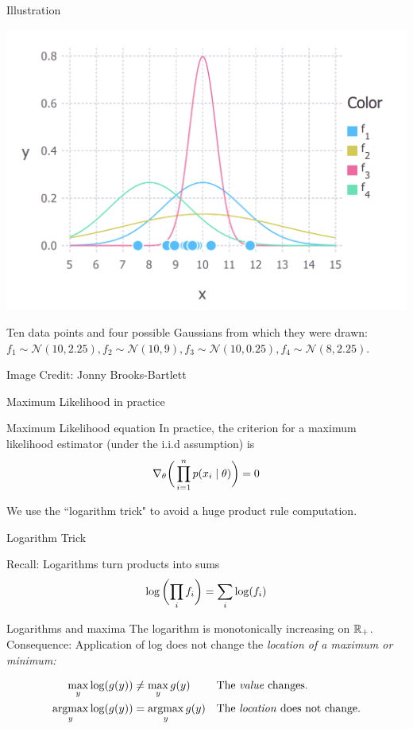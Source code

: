 \documentclass[10pt]{beamer}
\begin{document}
\begin{frame}{Illustration}
\begin{center}
\includegraphics[width=.8\textwidth]{images/ml_example}

\vfill
\scriptsize Ten data points and four possible Gaussians from which they were drawn: $f_1 \sim \mathcal{N}(10, 2.25), f_2 \sim \mathcal{N}(10, 9), f_3 \sim \mathcal{N}(10, 0.25), f_4 \sim \mathcal{N}(8, 2.25)$.   \\ %
\end{center}
\hfill \tiny Image Credit: Jonny Brooks-Bartlett
\end{frame}


\begin{frame}{Maximum Likelihood in practice}
\begin{sblock}{Maximum Likelihood equation}
In practice, the criterion for a maximum likelihood estimator (under the i.i.d assumption) is 
\[ \nabla_\theta \bigg( \displaystyle\prod_{i=1}^n p(x_i \; | \; \theta) \bigg) =0  \]
\end{sblock}
We use the ``logarithm trick" to avoid a huge product rule computation.
\end{frame}


\begin{frame}{Logarithm Trick}

\begin{sblock}{Recall: Logarithms turn products into sums}
\[ \log \bigg( {\displaystyle\prod_i f_i} \bigg) = \displaystyle\sum_i  \log (f_i) \]
\end{sblock}

\begin{sblock}{Logarithms and maxima}
The logarithm is monotonically increasing on $\mathbb{R}_+$.\\

Consequence: Application of log does not change the \it{location} of a maximum or minimum:

\begin{align*}
\max_y \log (g(y)) &\neq \max_y g(y)  && \text{The \textit{{value}} changes.} \\
\operatorname*{argmax}_y \log (g(y)) &= \operatorname*{argmax}_y g(y)  && \text{The \textit{{location}} does not change.}
\end{align*}


\end{sblock}


\end{frame}
\end{document}
